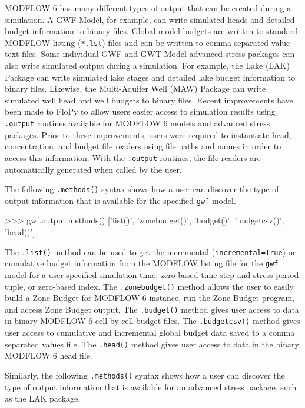 \documentclass[12pt, oneside]{article}  	%
\begin{document}
MODFLOW 6 has many different types of output that can be created during a simulation. A GWF Model, for example, can write simulated heads and detailed budget information to binary files. Global model budgets are written to standard MODFLOW listing (\texttt{*.lst}) files and can be written to comma-separated value text files. Some individual GWF and GWT Model advanced stress packages can also write simulated output during a simulation. For example, the Lake (LAK) Package can write simulated lake stages and detailed lake budget information to binary files. Likewise, the Multi-Aquifer Well (MAW) Package can write simulated well head and well budgets to binary files. Recent improvements have been made to FloPy to allow users easier access to simulation results using \texttt{.output} routines available for MODFLOW 6 models and advanced stress packages. Prior to these improvements, users were required to instantiate head, concentration, and budget file readers using file paths and names in order to access this information. With the \texttt{.output} routines, the file readers are automatically generated when called by the user.

The following \texttt{.methods()} syntax shows how a user can discover the type of output information that is available for the specified \texttt{gwf} model.

\begin{python}
>>> gwf.output.methods()
['list()', 'zonebudget()', 'budget()', 'budgetcsv()', 'head()']
\end{python}

\noindent The \texttt{.list()} method can be used to get the incremental (\texttt{incremental=True}) or cumulative budget information from the MODFLOW listing file for the \texttt{gwf} model for a user-specified simulation time, zero-based time step and stress period tuple, or zero-based index. The \texttt{.zonebudget()} method allows the user to easily build a Zone Budget for MODFLOW 6 instance, run the Zone Budget program, and access Zone Budget output. The \texttt{.budget()} method gives user access to data in binary MODFLOW 6 cell-by-cell budget files. The \texttt{.budgetcsv()} method gives user access to cumulative and incremental global budget data saved to a comma separated values file. The \texttt{.head()} method gives user access to data in the binary MODFLOW 6 head file.

Similarly, the following \texttt{.methods()} syntax shows how a user can discover the type of output information that is available for an advanced stress package, such as the LAK package.
\end{document}
